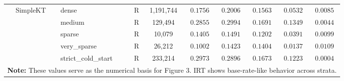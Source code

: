 \begin{table}[H]
{\begin{tabular}{lllrcccccc}
 & SimpleKT & dense & R & 1,191,744 & $0.1756$ & $0.2006$ & $0.1563$ & $0.0532$ & $0.0085$ \\
 &  & medium & R & 129,494 & $0.2855$ & $0.2994$ & $0.1691$ & $0.1349$ & $0.0044$ \\
 &  & sparse & R & 10,079 & $0.1405$ & $0.1491$ & $0.1202$ & $0.0391$ & $0.0099$ \\
 &  & very\_sparse & R & 26,212 & $0.1002$ & $0.1423$ & $0.1404$ & $0.0137$ & $0.0109$ \\
 &  & strict\_cold\_start & R & 233,214 & $0.2973$ & $0.2896$ & $0.1673$ & $0.1223$ & $0.0004$ \\
\bottomrule
\multicolumn{10}{p{17.5cm}}{\scriptsize \textbf{Note:} These values serve as the numerical basis for Figure 3. IRT shows base-rate-like behavior across strata.} \\
\end{tabular}%
}
\end{table}
